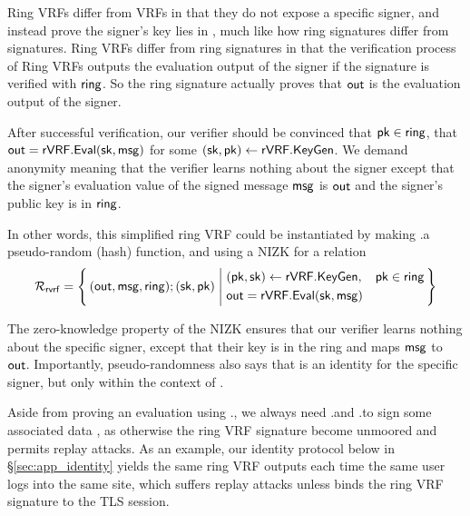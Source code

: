 Ring VRFs differ from VRFs in that they do not expose a specific signer,
and instead prove the signer's key lies in  \ring,
much like how ring signatures differ from signatures.
Ring VRFs differ from ring signatures in that the verification process of Ring VRFs outputs the evaluation output \Out of the signer if the signature is verified with $ \mathsf{ring} $. So  the ring signature  actually proves that $ {\mathsf{out}} $ is the evaluation output of the signer. 

After successful verification, our verifier should be convinced that $\mathsf{pk} \in \mathsf{ring}$, that
${\mathsf{out}} = {\mathsf{rVRF}}.{\mathsf{Eval}}(\mathsf{sk},\mathsf{msg})$ for some $(\mathsf{sk},\mathsf{pk}) \leftarrow {\ensuremath{\mathsf{rVRF}}}.{\mathsf{KeyGen}}$. We demand anonymity meaning that the verifier learns nothing about the signer except that the signer's evaluation value of the signed message $ \mathsf{msg} $ is $ {\mathsf{out}} $ and the signer's public key is in $ \mathsf{ring} $.

In other words, this simplified ring VRF could be instantiated by making
\rVRF.\Eval a pseudo-random (hash) function, and using a NIZK for a relation
\vspace{-3mm}
$$ \rel_{\mathsf{rvrf}} = \Setst{ (\Out, \msg, \ring);(\sk,\pk)}{
		\begin{aligned}
			& (\pk,\sk) \leftarrow \rVRF.\KeyGen,
			& \pk \in \ring \\
			& \Out = \rVRF.\Eval(\sk,\msg)
		\end{aligned}
} $$



The zero-knowledge property of the NIZK ensures that our verifier learns nothing about the specific
signer, except that their key is in the ring and maps $\mathsf{msg}$ to ${\mathsf{out}}$.
Importantly, pseudo-randomness also says that \Out is an identity
for the specific signer, but only within the context of \msg.


Aside from proving an evaluation using \rVRF.\Eval, 
we always need \rVRF.\Sign and \rVRF.\Verify to sign some associated data \aux,
as otherwise the ring VRF signature become unmoored and permits replay attacks.
%
As an example, our identity protocol below in \S\ref{sec:app_identity}
yields the same ring VRF outputs each time the same user logs into the
same site, which suffers replay attacks unless \aux binds the
ring VRF signature to the TLS session.


